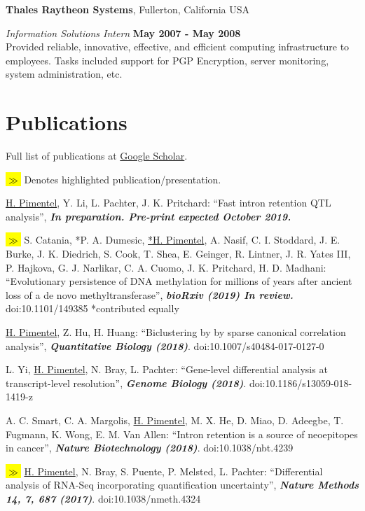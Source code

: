 \documentclass[overlapped]{res}
\newcommand{\hlc}[2][blue]{ {\sethlcolor{#1} \hl{#2}} }
\newcommand{\hlpub}{\hlc[Dandelion]{{\color{white}$\gg$} }}
\begin{document}
\begin{resume}
{\bf Thales Raytheon Systems}, Fullerton, California USA

\vspace{-.3cm}
{\em Information Solutions Intern} \hfill {\bf May 2007 - May 2008}\\
Provided reliable, innovative, effective, and efficient computing infrastructure
to employees. Tasks included support for PGP Encryption, server monitoring,
system administration, etc.



\section{\sc Publications}
Full list of publications at \href{https://scholar.google.com/citations?user=WfzyRAUAAAAJ&hl=en}{Google Scholar}.

\hlpub Denotes highlighted publication/presentation.

\underline{H. Pimentel}, Y. Li, L. Pachter, J. K. Pritchard: ``Fast intron retention QTL analysis'', {\bf \emph{In preparation. Pre-print expected October 2019.}}

\hlpub S. Catania, *P. A. Dumesic, \underline{*H. Pimentel}, A. Nasif, C. I. Stoddard, J. E. Burke, J. K. Diedrich, S. Cook, T. Shea, E. Geinger, R. Lintner, J. R. Yates III, P. Hajkova, G. J. Narlikar, C. A. Cuomo, J. K. Pritchard, H. D. Madhani: ``Evolutionary persistence of DNA methylation for millions of years after ancient loss of a de novo methyltransferase'', {\bf \emph{bioRxiv (2019) In review.}} doi:10.1101/149385 *contributed equally

\underline{H. Pimentel}, Z. Hu, H. Huang: ``Biclustering by by sparse
canonical correlation analysis'', {\bf \emph{Quantitative Biology (2018)}}. doi:10.1007/s40484-017-0127-0

L. Yi, \underline{H. Pimentel}, N. Bray, L. Pachter: ``Gene-level differential analysis at transcript-level resolution'', {\bf \emph{Genome Biology (2018)}}. doi:10.1186/s13059-018-1419-z

A. C. Smart, C. A. Margolis, \underline{H. Pimentel}, M. X. He, D. Miao, D. Adeegbe, T. Fugmann, K. Wong, E. M. Van Allen: ``Intron retention is a source of neoepitopes in cancer'',  {\bf \emph{Nature Biotechnology (2018)}}. doi:10.1038/nbt.4239

\hlpub\underline{H. Pimentel}, N. Bray, S. Puente, P. Melsted, L. Pachter:  ``Differential analysis of RNA-Seq incorporating quantification uncertainty'', {\bf \emph{Nature Methods 14, 7, 687 (2017)}}. doi:10.1038/nmeth.4324


\end{resume}
\end{document}
